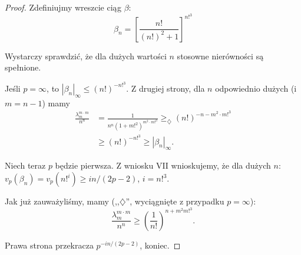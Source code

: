 \begin{proof}
	Zdefiniujmy wreszcie ciąg $\beta$:
	\[
		\beta_n = \left[\frac{n!}{(n!)^2+1} \right]^{n!^3}
	\]

	Wystarczy sprawdzić, że dla dużych wartości $n$ stosowne nierówności są spełnione.

	Jeśli $p = \infty$, to $|\beta_n|_\infty \le (n!)^{-n!^3}$.
	Z drugiej strony, dla $n$ odpowiednio dużych (i $m = n-1$) mamy
	\begin{align*}
		\frac{\lambda_m^{m \cdot m}}{n^n} & = \frac{1}{n^n (1+m!^2)^{m^2 \cdot m!^3}}  \ge_\diamondsuit (n!)^{-n-m^2 \cdot m!^3}\\
		& \ge (n!)^{-n!^3} \ge |\beta_n|_\infty.
	\end{align*}
	
	Niech teraz $p$ będzie pierwsza.
	Z wniosku VII wnioskujemy, że dla dużych $n$: $v_p(\beta_n) = v_p(n!^i) \ge in / (2p-2)$, $i = n!^3$.

	Jak już zauważyliśmy, mamy (,,$\diamondsuit$'', wyciągnięte z przypadku $p = \infty$):
	\[
		\frac{\lambda_{m}^{m \cdot m}}{n^n} \ge \left(\frac{1}{n!}\right)^{n + m^2 m!^3}.
	\]
	
	Prawa strona przekracza $p^{-in/(2p-2)}$, koniec.
\end{proof}